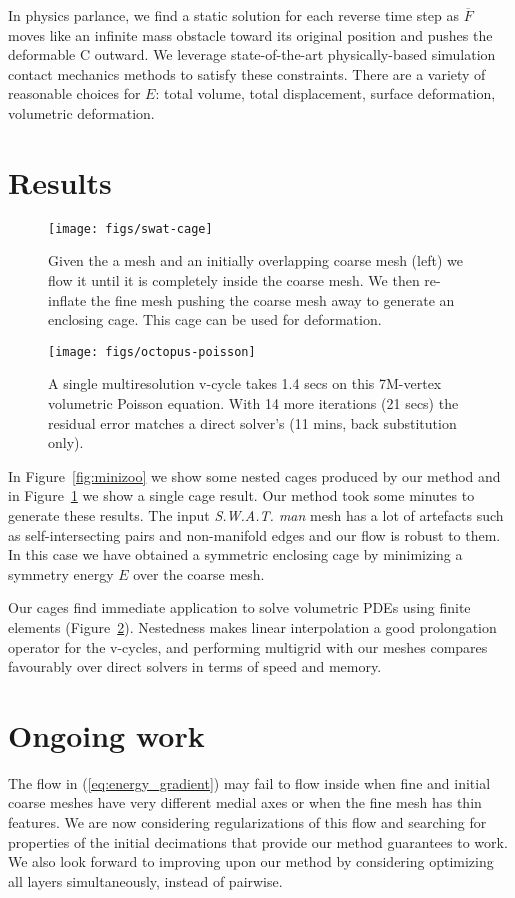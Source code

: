 \documentclass{cgyrf15}
\begin{document}
In physics parlance, we find a static solution for each reverse time step as
$\overline{F}$ moves like an infinite mass obstacle toward its original
position and pushes the deformable C outward. We leverage state-of-the-art
physically-based simulation contact mechanics methods to satisfy these
constraints. There are a variety of reasonable choices for $E$: total volume,
total displacement, surface deformation, volumetric deformation.

\section{Results}

\begin{figure}[t]
  \texttt{[image: figs/swat-cage]}
  \caption{Given the a mesh and an initially overlapping coarse mesh (left) we
  flow it until it is completely inside the coarse mesh. We then re-inflate the
  fine mesh pushing the coarse mesh away to generate an enclosing cage. This
  cage can be used for deformation.}
  \label{fig:swat}
\end{figure}

\begin{figure}[t]
  \texttt{[image: figs/octopus-poisson]}
  \caption{A single multiresolution v-cycle takes 1.4 secs on this 7M-vertex
  volumetric Poisson equation. With 14 more iterations (21 secs) the residual
  error matches a direct solver's (11 mins, back substitution only).}
  \label{fig:octopus}
\end{figure}

In Figure~\ref{fig:minizoo} we show some nested cages produced by our method
and in Figure~\ref{fig:swat} we show a single cage result. Our method took some
minutes to generate these results. The input \emph{S.W.A.T. man} mesh has a lot
of artefacts such as self-intersecting pairs and non-manifold edges and our
flow is robust to them. In this case we have obtained a symmetric enclosing
cage by minimizing a symmetry energy $E$ over the coarse mesh.

Our cages find immediate application to solve volumetric PDEs using finite
elements (Figure~\ref{fig:octopus}). Nestedness makes linear interpolation a
good prolongation operator for the v-cycles, and performing multigrid with our
meshes compares favourably over direct solvers in terms of speed and memory.

\section{Ongoing work}

The flow in (\ref{eq:energy_gradient}) may fail to flow inside when fine and
initial coarse meshes have very different medial axes or when the fine mesh has
thin features. We are now considering regularizations of this flow and
searching for properties of the initial decimations that provide our method
guarantees to work. We also look forward to improving upon our method by
considering optimizing all layers simultaneously, instead of pairwise.



 
\end{document}
